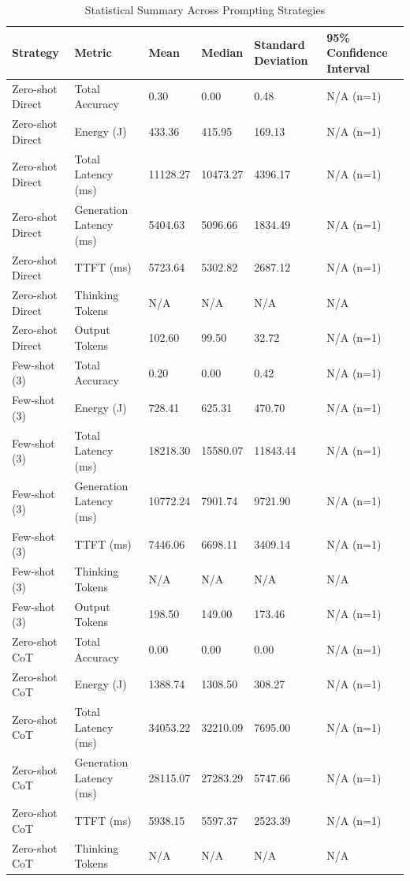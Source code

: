 \begin{table}
\caption{Statistical Summary Across Prompting Strategies}
\label{tab:statistical_summary}
\begin{tabular}{llllll}
\toprule
Strategy & Metric & Mean & Median & Standard Deviation & 95\% Confidence Interval \\
\midrule
Zero-shot Direct & Total Accuracy & 0.30 & 0.00 & 0.48 & N/A (n=1) \\
Zero-shot Direct & Energy (J) & 433.36 & 415.95 & 169.13 & N/A (n=1) \\
Zero-shot Direct & Total Latency (ms) & 11128.27 & 10473.27 & 4396.17 & N/A (n=1) \\
Zero-shot Direct & Generation Latency (ms) & 5404.63 & 5096.66 & 1834.49 & N/A (n=1) \\
Zero-shot Direct & TTFT (ms) & 5723.64 & 5302.82 & 2687.12 & N/A (n=1) \\
Zero-shot Direct & Thinking Tokens & N/A & N/A & N/A & N/A \\
Zero-shot Direct & Output Tokens & 102.60 & 99.50 & 32.72 & N/A (n=1) \\
Few-shot (3) & Total Accuracy & 0.20 & 0.00 & 0.42 & N/A (n=1) \\
Few-shot (3) & Energy (J) & 728.41 & 625.31 & 470.70 & N/A (n=1) \\
Few-shot (3) & Total Latency (ms) & 18218.30 & 15580.07 & 11843.44 & N/A (n=1) \\
Few-shot (3) & Generation Latency (ms) & 10772.24 & 7901.74 & 9721.90 & N/A (n=1) \\
Few-shot (3) & TTFT (ms) & 7446.06 & 6698.11 & 3409.14 & N/A (n=1) \\
Few-shot (3) & Thinking Tokens & N/A & N/A & N/A & N/A \\
Few-shot (3) & Output Tokens & 198.50 & 149.00 & 173.46 & N/A (n=1) \\
Zero-shot CoT & Total Accuracy & 0.00 & 0.00 & 0.00 & N/A (n=1) \\
Zero-shot CoT & Energy (J) & 1388.74 & 1308.50 & 308.27 & N/A (n=1) \\
Zero-shot CoT & Total Latency (ms) & 34053.22 & 32210.09 & 7695.00 & N/A (n=1) \\
Zero-shot CoT & Generation Latency (ms) & 28115.07 & 27283.29 & 5747.66 & N/A (n=1) \\
Zero-shot CoT & TTFT (ms) & 5938.15 & 5597.37 & 2523.39 & N/A (n=1) \\
Zero-shot CoT & Thinking Tokens & N/A & N/A & N/A & N/A \\

\end{tabular}
\end{table}
